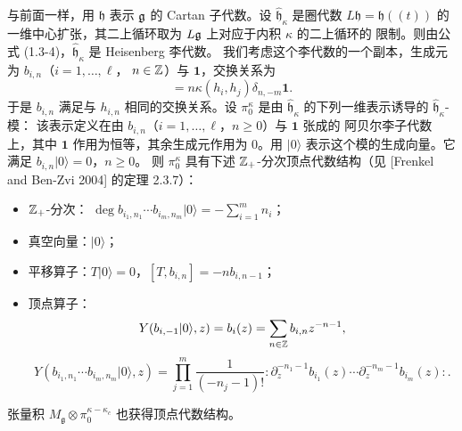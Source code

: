 与前面一样，用 $\mathfrak h$ 表示 $\mathfrak{g}$ 的 Cartan 子代数。设
$\widehat{\mathfrak h}_\kappa$ 是圈代数 $L\mathfrak h=\mathfrak h(\!(t)\!)$ 的
一维中心扩张，其二上循环取为 $L\mathfrak{g}$ 上对应于内积 $\kappa$ 的二上循环的
限制。则由公式 (1.3-4)，$\widehat{\mathfrak h}_\kappa$ 是 Heisenberg 李代数。
我们考虑这个李代数的一个副本，生成元为 $b_{i,n}$（$i=1,\dots,\ell$，
$n\in\mathbb{Z}$）与 $\mathbf 1$，交换关系为
\begin{equation}
    [b_{i,n},b_{j,m}]=n\kappa(h_i,h_j)\delta_{n,-m}\mathbf 1.
    \tag{6.2-1}
\end{equation}
于是 $b_{i,n}$ 满足与 $h_{i,n}$ 相同的交换关系。设 $\pi_0^\kappa$ 是由
$\widehat{\mathfrak h}_\kappa$ 的下列一维表示诱导的 $\widehat{\mathfrak h}_\kappa$-模：
该表示定义在由 $b_{i,n}$（$i=1,\dots,\ell$，$n\ge0$）与 $\mathbf 1$ 张成的
阿贝尔李子代数上，其中 $\mathbf 1$ 作用为恒等，其余生成元作用为 $0$。用
$|0\rangle$ 表示这个模的生成向量。它满足 $b_{i,n}|0\rangle=0$，$n\ge0$。
则 $\pi_0^\kappa$ 具有下述 $\mathbb{Z}_+$-分次顶点代数结构（见 [Frenkel and Ben-Zvi
2004] 的定理 2.3.7）：
\begin{itemize}[leftmargin=2em]
    \item $\mathbb{Z}_+$-分次：
    $\deg b_{i_1,n_1}\cdots b_{i_m,n_m}|0\rangle=-\sum_{i=1}^mn_i$；
    \item 真空向量：$|0\rangle$；
    \item 平移算子：$T|0\rangle=0$，$[T,b_{i,n}]=-nb_{i,n-1}$；
    \item 顶点算子：
    \[
        Y(b_{i,-1}|0\rangle,z)=b_i(z)=\sum_{n\in\mathbb{Z}}b_{i,n}z^{-n-1},
    \]
    \[
        Y(b_{i_1,n_1}\cdots b_{i_m,n_m}|0\rangle,z)
        =\prod_{j=1}^m\frac{1}{(-n_j-1)!}
        :\!\partial_z^{-n_1-1}b_{i_1}(z)\cdots
        \partial_z^{-n_m-1}b_{i_m}(z)\!:.
    \]
\end{itemize}
张量积 $M_{\mathfrak g}\otimes\pi_0^{\kappa-\kappa_c}$ 也获得顶点代数结构。


